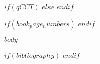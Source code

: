 \documentclass[12pt,letterpaper,twoside]{article}
\begin{document}
$if(qCCT)$
$else$
\vspace*{1.5in}
\tableofcontents
\thispagestyle{fancy}
\newpage
$endif$




$if(book_page_numbers)$
$endif$

$body$

$if(bibliography)$
\newpage
\printbibliography[heading=bibintoc,title={References}]
$endif$

%

%

\end{document}
